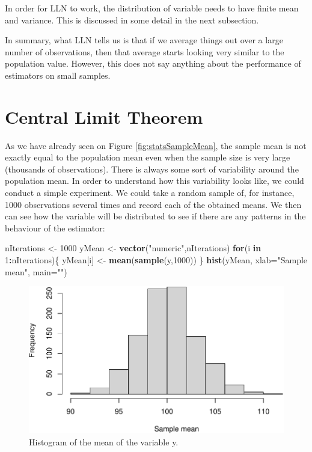 \documentclass[
]{book}
\newenvironment{Shaded}{\begin{snugshade}}{\end{snugshade}}
\newcommand{\ControlFlowTok}[1]{\textcolor[rgb]{0.13,0.29,0.53}{\textbf{#1}}}
\newcommand{\DataTypeTok}[1]{\textcolor[rgb]{0.13,0.29,0.53}{#1}}
\newcommand{\DecValTok}[1]{\textcolor[rgb]{0.00,0.00,0.81}{#1}}
\newcommand{\KeywordTok}[1]{\textcolor[rgb]{0.13,0.29,0.53}{\textbf{#1}}}
\newcommand{\NormalTok}[1]{#1}
\newcommand{\OperatorTok}[1]{\textcolor[rgb]{0.81,0.36,0.00}{\textbf{#1}}}
\newcommand{\StringTok}[1]{\textcolor[rgb]{0.31,0.60,0.02}{#1}}
\theoremstyle{definition}
\theoremstyle{definition}
\theoremstyle{definition}
\theoremstyle{definition}
\theoremstyle{remark}
\begin{document}
In order for LLN to work, the distribution of variable needs to have finite mean and variance. This is discussed in some detail in the next subsection.

In summary, what LLN tells us is that if we average things out over a large number of observations, then that average starts looking very similar to the population value. However, this does not say anything about the performance of estimators on small samples.

\hypertarget{CLT}{%
\section{Central Limit Theorem}\label{CLT}}

As we have already seen on Figure \ref{fig:statsSampleMean}, the sample mean is not exactly equal to the population mean even when the sample size is very large (thousands of observations). There is always some sort of variability around the population mean. In order to understand how this variability looks like, we could conduct a simple experiment. We could take a random sample of, for instance, 1000 observations several times and record each of the obtained means. We then can see how the variable will be distributed to see if there are any patterns in the behaviour of the estimator:

\begin{Shaded}
\begin{Highlighting}[]
\NormalTok{nIterations \textless{}{-}}\StringTok{ }\DecValTok{1000}
\NormalTok{yMean \textless{}{-}}\StringTok{ }\KeywordTok{vector}\NormalTok{(}\StringTok{"numeric"}\NormalTok{,nIterations)}
\ControlFlowTok{for}\NormalTok{(i }\ControlFlowTok{in} \DecValTok{1}\OperatorTok{:}\NormalTok{nIterations)\{}
\NormalTok{    yMean[i] \textless{}{-}}\StringTok{ }\KeywordTok{mean}\NormalTok{(}\KeywordTok{sample}\NormalTok{(y,}\DecValTok{1000}\NormalTok{))}
\NormalTok{\}}
\KeywordTok{hist}\NormalTok{(yMean, }\DataTypeTok{xlab=}\StringTok{"Sample mean"}\NormalTok{, }\DataTypeTok{main=}\StringTok{""}\NormalTok{)}
\end{Highlighting}
\end{Shaded}

\begin{figure}
\centering
\includegraphics{Svetunkov---Statistics-for-Business-Analytics_files/figure-latex/histyMean-1.pdf}
\caption{\label{fig:histyMean}Histogram of the mean of the variable y.}
\end{figure}
\end{document}
